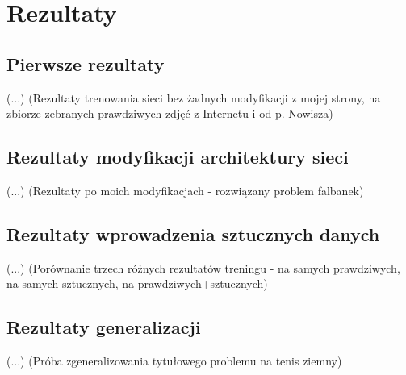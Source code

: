 \chapter{Rezultaty}

\section{Pierwsze rezultaty}

(...) (Rezultaty trenowania sieci bez żadnych modyfikacji z mojej strony, na zbiorze zebranych prawdziwych zdjęć z Internetu i od p. Nowisza)

\section{Rezultaty modyfikacji architektury sieci}

(...) (Rezultaty po moich modyfikacjach - rozwiązany problem falbanek)

\section{Rezultaty wprowadzenia sztucznych danych}

(...) (Porównanie trzech różnych rezultatów treningu - na samych prawdziwych, na samych sztucznych, na prawdziwych+sztucznych)

\section{Rezultaty generalizacji}

(...) (Próba zgeneralizowania tytułowego problemu na tenis ziemny)
